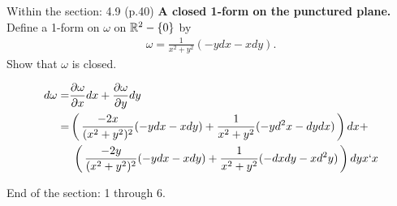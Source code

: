 \documentclass[10pt,a4paper]{report}
\newcommand{\BLUE}[1]{\textcolor{blue}{#1}}
\begin{document}
\begin{description}
	\item Within the section: 4.9 (p.40) \textbf{A closed 1-form on the punctured plane.}  Define a 1-form on $\omega$ on $\mathbb{R}^2-\{0\}$ by 
	\begin{align*}
		\omega = \frac{1}{x^2+y^2}
(-ydx-xdy).	
\end{align*}Show that $\omega$ is closed.

\BLUE{\begin{align*}
	d\omega = &\frac{\partial \omega}{\partial x}dx+\frac{\partial \omega}{\partial y}dy \\
	= &\left (\, \frac{-2x}{(x^2+y^2)^2}(-ydx-xdy)+\frac{1}{x^2+y^2}(-yd^2x-dydx) \,\right )dx+ \\
	&\; \left (\, \frac{-2y}{(x^2+y^2)^2}(-ydx-xdy)+\frac{1}{x^2+y^2}(-dxdy-xd^2y) \,\right )dy x`x	
\end{align*}
}
\end{description}

End of the section: 1 through 6.
\end{document}
